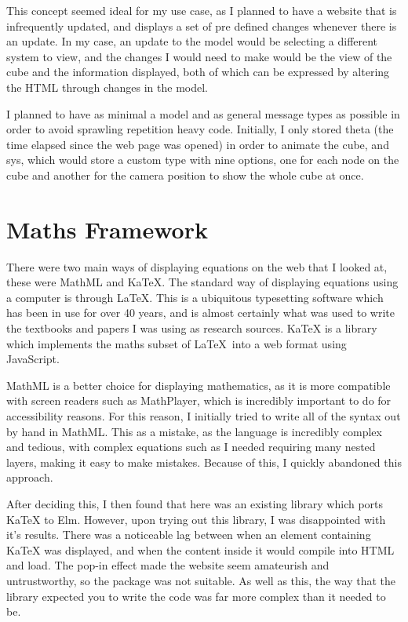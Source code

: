 \documentclass{l4proj}
\begin{document}
This concept seemed ideal for my use case, as I planned to have a website that is infrequently updated, and displays a set of pre defined changes whenever there is an update.  In my case, an update to the model would be selecting a different system to view, and the changes I would need to make would be the view of the cube and the information displayed, both of which can be expressed by altering the HTML through changes in the model.

I planned to have as minimal a model and as general message types as possible in order to avoid sprawling repetition heavy code.  Initially, I only stored theta (the time elapsed since the web page was opened) in order to animate the cube, and sys, which would store a custom type with nine options, one for each node on the cube and another for the camera position to show the whole cube at once.

\section{Maths Framework}

There were two main ways of displaying equations on the web that I looked at, these were MathML and KaTeX.  The standard way of displaying equations using a computer is through \LaTeX.  This is a ubiquitous typesetting software which has been in use for over 40 years, and is almost certainly what was used to write the textbooks and papers I was using as research sources.  KaTeX is a library which implements the maths subset of \LaTeX \ into a web format using JavaScript.

MathML is a better choice for displaying mathematics, as it is more compatible with screen readers such as MathPlayer, which is incredibly important to do for accessibility reasons.  For this reason, I initially tried to write all of the syntax out by hand in MathML.  This as a mistake, as the language is incredibly complex and tedious, with complex equations such as I needed requiring many nested layers, making it easy to make mistakes.  Because of this, I quickly abandoned this approach.

After deciding this, I then found that here was an existing library which ports KaTeX to Elm.  However, upon trying out this library, I was disappointed with it's results.  There was a noticeable lag between when an element containing KaTeX was displayed, and when the content inside it would compile into HTML and load.  The pop-in effect made the website seem amateurish and untrustworthy, so the package was not suitable.  As well as this, the way that the library expected you to write the code was far more complex than it needed to be.
\end{document}
